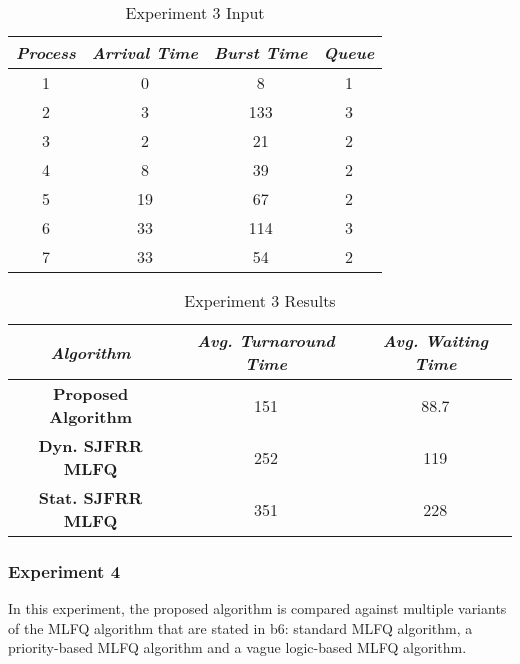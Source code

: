 \documentclass[conference]{IEEEtran}
\newcommand\T{\rule{0pt}{2.6ex}}       %
\newcommand\B{\rule[-1.2ex]{0pt}{0pt}} %
\begin{document}
\begin{table}[H]
    \caption{Experiment 3 Input}
    \centering
     \begin{tabular}{||c c c c||} 
     \hline
     \textit{\textbf{Process}} & \textit{\textbf{Arrival Time}} & \textit{\textbf{Burst Time}} & \textit{\textbf{Queue}} \T \B \\ 
     \hline
     \hline
     1 & 0 & 8 & 1 \T \B \\ 
     \hline
     2 & 3 & 133 & 3 \T \B \\
     \hline
     3 & 2 & 21 & 2 \T \B \\
     \hline
     4 & 8 & 39 & 2 \T \B \\
     \hline
     5 & 19 & 67 & 2 \T \B \\ 
     \hline
     6 & 33 & 114 & 3 \T \B \\ 
     \hline
     7 & 33 & 54 & 2 \T \B \\ 
     \hline
     \end{tabular}
\end{table}

\begin{table}[H]
    \caption{Experiment 3 Results}
    \centering
    \begin{tabular}{||c c c||}
        \hline
        \textit{\textbf{Algorithm}} & \textit{\textbf{Avg. Turnaround Time}} & \textit{\textbf{Avg. Waiting Time}}\T \B \\
    \hline
    \hline
    \textbf{Proposed Algorithm} & 151 & 88.7 \T \B\\ \hline
    \textbf{Dyn. SJFRR MLFQ} & 252 & 119 \T \B\\ \hline
    \textbf{Stat. SJFRR MLFQ} & 351 & 228 \T \B\\ \hline
     \end{tabular}
\end{table}

\subsubsection{Experiment 4}

In this experiment, the proposed algorithm is compared against multiple variants of the MLFQ algorithm that are stated in {b6}: standard MLFQ algorithm, a priority-based MLFQ algorithm and a vague logic-based MLFQ algorithm.
\end{document}
